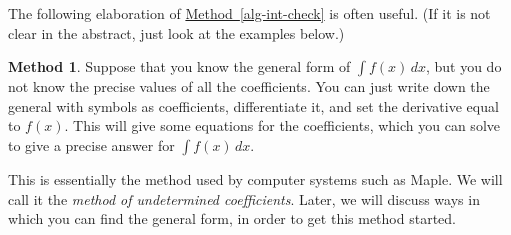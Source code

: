 \documentclass[a4paper]{book}
\newcommand{\PURPLE}[1]{{\color{purple}#1}}
\renewcommand{\:}{\colon}
\newcommand{\biref}[2]{\hyperlink{#2}{#1~\ref*{#2}}}
\newcommand{\DEFN}[1]{\PURPLE{\emph{#1}}}
\theoremstyle{definition}
\newtheorem{method}[theorem]{Method}
\begin{document}
The following elaboration of \biref{Method}{alg-int-check} is often
useful.  (If it is not clear in the abstract, just look at the
examples below.)
\begin{method}
 Suppose that you know the general form of $\int f(x)\,dx$, but you do
 not know the precise values of all the coefficients.  You can just
 write down the general with symbols as coefficients, differentiate
 it, and set the derivative equal to $f(x)$.  This will give some
 equations for the coefficients, which you can solve to give a precise
 answer for $\int f(x)\,dx$.
\end{method}
This is essentially the method used by computer systems such as Maple.
We will call it the \DEFN{method of undetermined coefficients}.
Later, we will discuss ways in which you can find the general form, in
order to get this method started.
\end{document}
